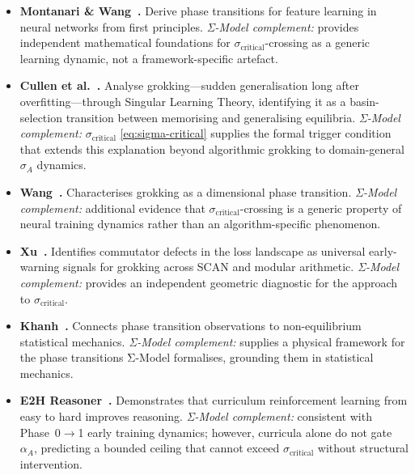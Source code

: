 \documentclass[10pt]{article}
\begin{document}
\begin{itemize}[nosep]
\item \textbf{Montanari \& Wang~\cite{montanari2026}.} Derive phase transitions for feature learning in neural networks from first principles. \emph{Σ-Model complement:} provides independent mathematical foundations for $\sigma_{\text{critical}}$-crossing as a generic learning dynamic, not a framework-specific artefact.

\item \textbf{Cullen et al.~\cite{cullen2026basinselectiongrokking}.} Analyse grokking---sudden generalisation long after overfitting---through Singular Learning Theory, identifying it as a basin-selection transition between memorising and generalising equilibria. \emph{Σ-Model complement:} $\sigma_{\text{critical}}$ \eqref{eq:sigma-critical} supplies the formal trigger condition that extends this explanation beyond algorithmic grokking to domain-general $\sigma_A$ dynamics.

\item \textbf{Wang~\cite{wang2026grokkingdimensionalphase}.} Characterises grokking as a dimensional phase transition. \emph{Σ-Model complement:} additional evidence that $\sigma_{\text{critical}}$-crossing is a generic property of neural training dynamics rather than an algorithm-specific phenomenon.

\item \textbf{Xu~\cite{xu2026earlywarning}.} Identifies commutator defects in the loss landscape as universal early-warning signals for grokking across SCAN and modular arithmetic. \emph{Σ-Model complement:} provides an independent geometric diagnostic for the approach to $\sigma_{\text{critical}}$.

\item \textbf{Khanh~\cite{khanh2026phasetransitionsdriven}.} Connects phase transition observations to non-equilibrium statistical mechanics. \emph{Σ-Model complement:} supplies a physical framework for the phase transitions Σ-Model formalises, grounding them in statistical mechanics.

\item \textbf{E2H Reasoner~\cite{e2h2025}.} Demonstrates that curriculum reinforcement learning from easy to hard improves reasoning. \emph{Σ-Model complement:} consistent with Phase~0$\to$1 early training dynamics; however, curricula alone do not gate $\alpha_A$, predicting a bounded ceiling that cannot exceed $\sigma_{\text{critical}}$ without structural intervention.
\end{itemize}
\end{document}
